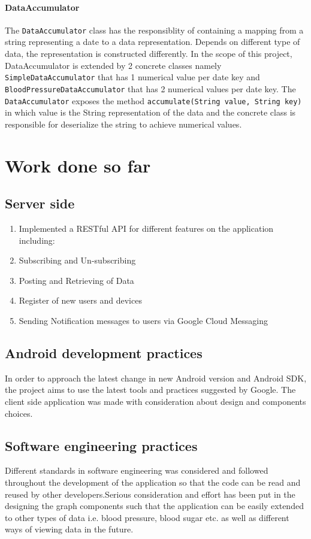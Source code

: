 \paragraph{DataAccumulator}
The \texttt{DataAccumulator} class has the responsiblity of containing a mapping from a string representing a date to a
data representation. Depends on different type of data, the representation is constructed differently. In the scope of
this project, DataAccumulator is extended by 2 concrete classes namely \texttt{SimpleDataAccumulator} that has 1
numerical value per date key and \texttt{BloodPressureDataAccumulator} that has 2 numerical values per date key. The
\texttt{DataAccumulator} exposes the method \texttt{accumulate(String value, String key)} in which value is the String
representation of the data and the concrete class is responsible for deserialize the string to achieve numerical values.

\section{Work done so far}
\label{sec:Work done so far}
\subsection{Server side}

\begin{enumerate}
    \item Implemented a RESTful API for different features on the application including:
    \item Subscribing and Un-subscribing
    \item Posting and Retrieving of Data
    \item Register of new users and devices
    \item Sending Notification messages to users via Google Cloud Messaging
\end{enumerate}

\subsection{Android development practices}
In order to approach the latest change in new Android version and Android SDK, the project aims to use the latest tools
and practices suggested by Google. The client side application was made with consideration about design and components
choices.

\subsection{Software engineering practices}
Different standards in software engineering was considered and followed throughout the development of the application so
that the code can be read and reused by other developers.Serious consideration and effort has been put in the designing
the graph components such that the application can be easily extended to other types of data i.e. blood pressure, blood
sugar etc. as well as different ways of viewing data in the future.

